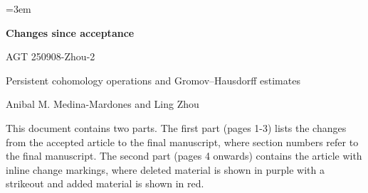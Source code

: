 \documentclass[11pt]{article}
\begin{document}
\sloppy\emergencystretch=3em
\begin{center}
{\Large\bfseries Changes since acceptance}\par
{\large AGT 250908-Zhou-2}\par
Persistent cohomology operations and Gromov--Hausdorff estimates\par
Anibal M. Medina-Mardones and Ling Zhou
\end{center}

This document contains two parts. The first part (pages 1-3) lists the changes from the accepted article to the final manuscript, where section numbers refer to the final manuscript.
The second part (pages 4 onwards) contains the article with inline change markings, where deleted material is shown in purple with a strikeout and added material is shown in red.


\clearpage

\end{document}
